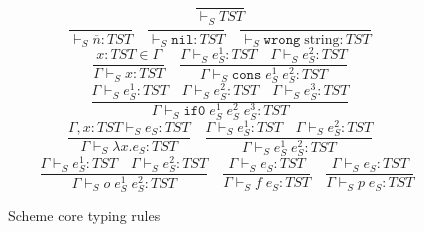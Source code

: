 \begin{figure}[p]
\label{sctr}
\caption{Scheme core typing rules}
\[
\frac{}{\vdash_{S}TST}
\]
\bigskip
\[
\frac{}{\vdash_{S}\overline{n}:TST}
\quad
\frac{}{\vdash_{S}\mathtt{nil}:TST}
\quad
\frac{}{\vdash_{S}\mathtt{wrong}\;\mathrm{string}:TST}
\]
\[
\frac{x:TST\in\Gamma}{\Gamma\vdash_{S}x:TST}
\quad
\frac{\Gamma\vdash_{S}e_{S}^{1}:TST\quad\Gamma\vdash_{S}e_{S}^{2}:TST}{\Gamma\vdash_{S}\mathtt{cons}\;e_{S}^{1}\;e_{S}^{2}:TST}
\]
\[
\frac{\Gamma\vdash_{S}e_{S}^{1}:TST\quad\Gamma\vdash_{S}e_{S}^{2}:TST\quad\Gamma\vdash_{S}e_{S}^{3}:TST}{\Gamma\vdash_{S}\mathtt{if0}\;e_{S}^{1}\;e_{S}^{2}\;e_{S}^{3}:TST}
\]
\[
\frac{\Gamma,x:TST\vdash_{S}e_{S}:TST}{\Gamma\vdash_{S}\lambda x.e_{S}:TST}
\quad
\frac{\Gamma\vdash_{S}e_{S}^{1}:TST\quad\Gamma\vdash_{S}e_{S}^{2}:TST}{\Gamma\vdash_{S}e_{S}^{1}\;e_{S}^{2}:TST}
\]
\[
\quad
\frac{\Gamma\vdash_{S}e_{S}^{1}:TST\quad\Gamma\vdash_{S}e_{S}^{2}:TST}{\Gamma\vdash_{S}o\;e_{S}^{1}\;e_{S}^{2}:TST}
\quad
\frac{\Gamma\vdash_{S}e_{S}:TST}{\Gamma\vdash_{S}f\;e_{S}:TST}
\quad
\frac{\Gamma\vdash_{S}e_{S}:TST}{\Gamma\vdash_{S}p\;e_{S}:TST}
\]
\end{figure}